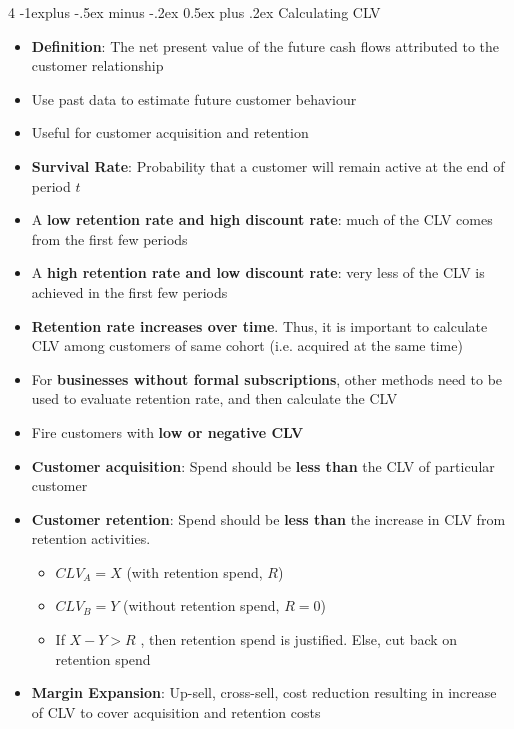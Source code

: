 \documentclass[10pt, landscape]{article}
\makeatletter
\renewcommand{\subsection}{\@startsection{subsection}{2}{0mm}%
  {-1explus -.5ex minus -.2ex}%
  {0.5ex plus .2ex}%
{\normalfont\normalsize\bfseries}}
\makeatother
\begin{document}
\begin{multicols*}{4}
  \subsection{Calculating CLV}
    \begin{itemize}
      \item \textbf{Definition}: The net present value of the future cash flows attributed to the customer relationship
      \item Use past data to estimate future customer behaviour
      \item Useful for customer acquisition and retention
      \item \textbf{Survival Rate}: Probability that a customer will remain active at the end of period $t$
      \item A \textbf{low retention rate and high discount rate}: much of the CLV comes from the first few periods
      \item A \textbf{high retention rate and low discount rate}: very less of the CLV is achieved in the first few periods
      \item \textbf{Retention rate increases over time}. Thus, it is important to calculate CLV among customers of same cohort (i.e. acquired at the same time)
      \item For \textbf{businesses without formal subscriptions}, other methods need to be used to evaluate retention rate, and then calculate the CLV
      \item Fire customers with \textbf{low or negative CLV}
      \item \textbf{Customer acquisition}: Spend should be \textbf{less than} the CLV of particular customer
      \item \textbf{Customer retention}: Spend should be \textbf{less than} the increase in CLV from retention activities.
        \begin{itemize}
          \item \( CLV_A = X \) (with retention spend, $R$)
          \item \( CLV_B = Y \) (without retention spend, $R = 0$)
          \item If \( X - Y > R \) , then retention spend is justified. Else, cut back on retention spend
        \end{itemize}
      \item \textbf{Margin Expansion}: Up-sell, cross-sell, cost reduction resulting in increase of CLV to cover acquisition and retention costs
    \end{itemize}


\end{multicols*}
\end{document}
